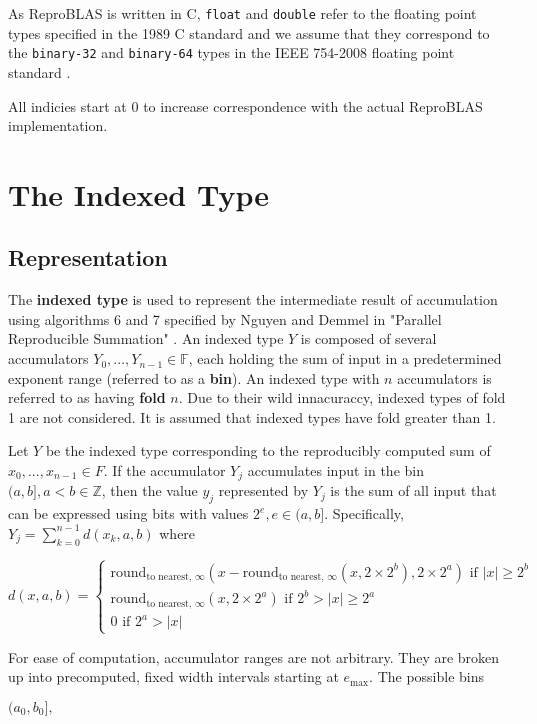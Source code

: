 \documentclass[12pt]{article}
\providecommand{\F}{\ensuremath{\mathbb{F}}}
\providecommand{\Z}{\ensuremath{\mathbb{Z}}}
\providecommand{\max}{\ensuremath{\text{max}}}
\providecommand{\roundtonearestinfty}{\ensuremath{\text{round}_\text{to nearest, $\infty$}}}
\theoremstyle{plain}
\begin{document}
  As ReproBLAS is written in C, \verb|float| and \verb|double| refer to the floating point types specified in the 1989 C standard \cite{c89} and we assume that they correspond to the \verb|binary-32| and \verb|binary-64| types in the IEEE 754-2008 floating point standard \cite{ieee754}.

  All indicies start at 0 to increase correspondence with the actual ReproBLAS implementation.

\section{The Indexed Type}
  \subsection{Representation}
    The \textbf{indexed type} is used to represent the intermediate result of accumulation using algorithms 6 and 7 specified by Nguyen and Demmel in "Parallel Reproducible Summation" \cite{repsum}.
    An indexed type $Y$ is composed of several accumulators $Y_0, ..., Y_{n - 1} \in \F$, each holding the sum of input in a predetermined exponent range (referred to as a \textbf{bin}). An indexed type with $n$ accumulators is referred to as having \textbf{fold} $n$. Due to their wild innacuraccy, indexed types of fold 1 are not considered. It is assumed that indexed types have fold greater than 1.

    Let $Y$ be the indexed type corresponding to the reproducibly computed sum of $x_0, ..., x_{n - 1} \in F$.
    If the accumulator $Y_j$ accumulates input in the bin $(a, b], a < b \in \Z$, then the value $y_j$ represented by $Y_j$ is the sum of all input that can be expressed using bits with values $2^e, e \in (a, b]$. Specifically, $Y_j = \sum\limits_{k = 0}^{n - 1}d(x_k, a, b)$ where

    $d(x, a, b) = \begin{cases}\roundtonearestinfty(x - \roundtonearestinfty(x, 2 \times 2^b), 2 \times 2^a) \text{ if } |x| \geq 2^b \\ \roundtonearestinfty(x, 2 \times 2^a) \text{ if } 2^b > |x| \geq 2^a \\ 0 \text{ if } 2^a > |x| \end{cases}$

    For ease of computation, accumulator ranges are not arbitrary. They are broken up into precomputed, fixed width intervals starting at $e_{\max}$. The possible bins

    $(a_0, b_0],$
\end{document}
